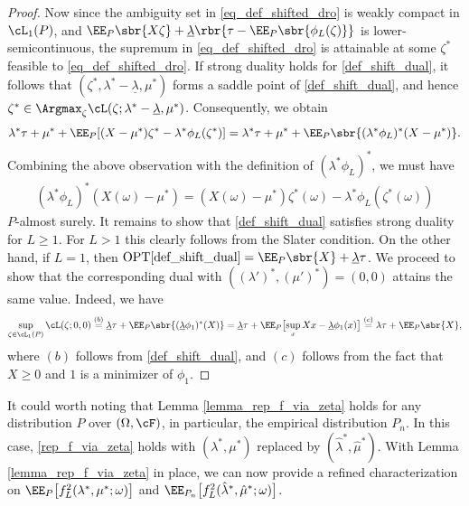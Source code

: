 \documentclass[9pt]{article} %
\numberwithin{equation}{section}
\begin{document}
\begin{proof}
 Now since the ambiguity set in \eqref{eq_def_shifted_dro} is weakly compact in $\cL_1(P)$, 
 and 
 $\EE_P \sbr{X \zeta} + \underline{\lambda} \rbr{ \tau - \EE_P \sbr{\phi_L(\zeta)}}$ is lower-semicontinuous, 
  the supremum in \eqref{eq_def_shifted_dro} is attainable at some $\zeta^*$ feasible to \eqref{eq_def_shifted_dro}. 
If strong duality holds for \eqref{def_shift_dual}, 
it follows that  
 $(\zeta^*, \lambda^* - \underline{\lambda}, \mu^*)$ forms a saddle point of \eqref{def_shift_dual}, and hence 
 $\zeta^* \in \Argmax_{\zeta} \cL(\zeta; \lambda^* - \underline{\lambda}, \mu^*)$.
 Consequently, we obtain
 \begin{align*}
\lambda^* \tau + \mu^* + \EE_P [ (X-\mu^*) \zeta^* -\lambda^* \phi_L(\zeta^*) ]
= \lambda^* \tau + \mu^* + \EE_P \sbr{ (\lambda^* \phi_L)^* (X - \mu^*) }.
 \end{align*}
Combining the above observation with the definition of $(\lambda^* \phi_L)^*$, we must have 
\begin{align*}
 (\lambda^* \phi_L)^* (X(\omega) - \mu^*)  = (X(\omega) -\mu^*) \zeta^*(\omega) -\lambda^* \phi_L(\zeta^* (\omega)) 
\end{align*}
$P$-almost surely.
It remains to show that \eqref{def_shift_dual} satisfies strong duality for $L \geq 1$. For $L > 1$ this clearly follows from the Slater condition. 
On the other hand, if $L = 1$, then $\mathrm{OPT}\eqref{def_shift_dual} = \EE_P \sbr{X}  + \underline{\lambda} \tau$.
We proceed to show that the corresponding dual with $((\lambda')^*, (\mu')^*) = (0,0)$ attains the same value. 
Indeed, we have 
\begin{align*}
\sup_{\zeta \in \cL_1(P)} \cL(\zeta; 0,0) \overset{(b)}{=} \underline{\lambda} \tau + \EE_P \sbr{(\underline{\lambda} \phi_1)^*(X)} 
=  \underline{\lambda} \tau + \EE_P \big[{\sup_x Xx - \underline{\lambda} \phi_1(x)} \big] \overset{(c)}{=} \lambda \tau + \EE_P \sbr{X},
\end{align*}
where $(b)$ follows from \eqref{def_shift_dual}, and $(c)$ follows from the fact that $X \geq 0$ and $1$ is a minimizer of $\phi_1$. 
\end{proof}

It could worth noting that Lemma \ref{lemma_rep_f_via_zeta} holds for any distribution $P$ over $(\Omega, \cF)$, in particular, the empirical distribution $P_n$. 
In this case, \eqref{rep_f_via_zeta} holds with $(\lambda^*, \mu^*)$ replaced by $(\hat{\lambda}^*, \hat{\mu}^*)$. 
With Lemma \ref{lemma_rep_f_via_zeta} in place, we can now provide a refined characterization on $\EE_P \big[{f_{L}^2 (\lambda^*,\mu^*; \omega)}\big]$ and 
$\EE_{P_n} \big[{f_{L}^2 (\hat{\lambda}^*,\hat{\mu}^*; \omega)}\big]$.
\end{document}
